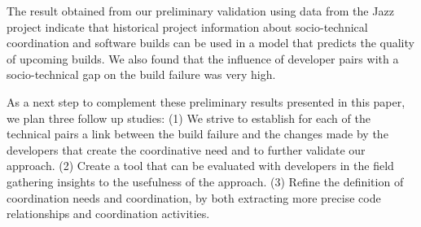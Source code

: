 \documentclass[conference]{IEEEtran}
\begin{document}
The result obtained from our preliminary validation using data from the Jazz project indicate that 
historical project information about socio-technical coordination and software
builds can be used in a model that predicts the quality of upcoming builds. We also found
that the influence of developer pairs with a socio-technical gap on the build
failure was very high. 

As a next step to complement these preliminary results presented in this paper, we plan three follow up studies:
(1) We strive to establish for each of the technical pairs a link between the build failure and the changes made by the developers that create the coordinative need and to further validate our approach.
(2) Create a tool that can be evaluated with developers in the field gathering insights to the usefulness of the approach.
(3) Refine the definition of coordination needs and coordination, by both extracting more precise code relationships and coordination activities.



\end{document}
